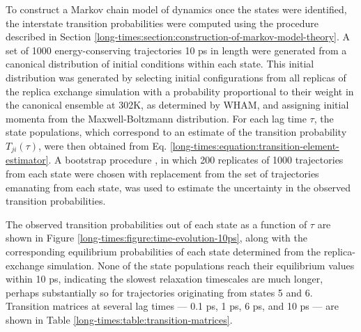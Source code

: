 To construct a Markov chain model of dynamics once the states were identified, the interstate transition probabilities were computed using the procedure described in Section \ref{long-times:section:construction-of-markov-model-theory}.
A set of 1000 energy-conserving trajectories 10 ps in length were generated from a canonical distribution of initial conditions within each state.
This initial distribution was generated by selecting initial configurations from all replicas of the replica exchange simulation with a probability proportional to their weight in the canonical ensemble at 302K, as determined by WHAM, and assigning initial momenta from the Maxwell-Boltzmann distribution.
For each lag time $\tau$, the state populations, which correspond to an estimate of the transition probability $T_{ji}(\tau)$, were then obtained from Eq. \ref{long-times:equation:transition-element-estimator}.
A bootstrap procedure \cite{efron:1979a}, in which 200 replicates of 1000 trajectories from each state were chosen with replacement from the set of trajectories emanating from each state, was used to estimate the uncertainty in the observed transition probabilities.

The observed transition probabilities out of each state as a function of $\tau$ are shown in Figure \ref{long-times:figure:time-evolution-10ps}, along with the corresponding equilibrium probabilities of each state determined from the replica-exchange simulation.
None of the state populations reach their equilibrium values within 10 ps, indicating the slowest relaxation timescales are much longer, perhaps substantially so for trajectories originating from states 5 and 6.
Transition matrices at several lag times --- 0.1 ps, 1 ps, 6 ps, and 10 ps --- are shown in Table \ref{long-times:table:transition-matrices}.

